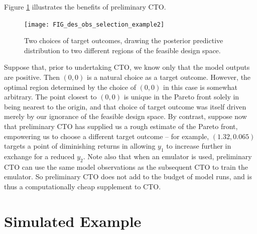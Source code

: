\documentclass[twocolumn,10pt]{asme2ej}
\begin{document}
Figure \ref{fig:do_selection_example} illustrates the benefits of preliminary CTO.
%
\begin{figure}
	\centering
	\texttt{[image: FIG\_des\_obs\_selection\_example2]}
	\caption{Two choices of target outcomes, drawing the posterior predictive distribution to two different regions of the feasible design space.}
	\label{fig:do_selection_example}
\end{figure}
%
Suppose that, prior to undertaking CTO, we know only that the model outputs are positive.
%
Then $(0,0)$ is a natural choice as a target outcome.
%
However, the optimal region determined by the choice of $(0,0)$ in this case is somewhat arbitrary.
%
%
The point closest to $(0,0)$ is unique in the Pareto front solely in being nearest to the origin, and that choice of target outcome was itself driven merely by our ignorance of the feasible design space.
%
%
By contrast, suppose now that preliminary CTO has supplied us a rough estimate of the Pareto front, empowering us to choose a different target outcome -- for example, $(1.32,0.065)$ targets a point of diminishing returns in allowing $y_1$ to increase further in exchange for a reduced $y_2$.
%
%
%
%
Note also that when an emulator is used, preliminary CTO can use the same model observations as the subsequent CTO to train the emulator.
%
So preliminary CTO does not add to the budget of model runs, and is thus a computationally cheap supplement to CTO.
%

%
\section{Simulated Example}\label{example}
%
\end{document}
